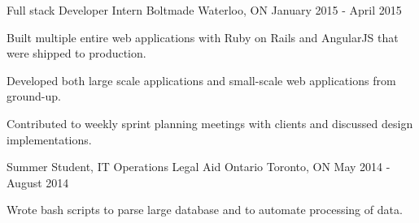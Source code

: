 \begin{cventries}
  \cventry
    {Full stack Developer Intern} %
    {Boltmade} %
    {Waterloo, ON} %
    {January 2015 - April 2015} %
    {
      \begin{cvitems} %
      \item {Built multiple entire web applications with Ruby on Rails and AngularJS that were shipped to production.}
      \item {Developed both large scale applications and small-scale web applications from ground-up.}
      \item {Contributed to weekly sprint planning meetings with clients and discussed design implementations.}
  \end{cvitems} 
    }
  \cventry
    {Summer Student, IT Operations} %
    {Legal Aid Ontario} %
    {Toronto, ON} %
    {May 2014 - August 2014} %
    {
      \begin{cvitems} %
      \item {Wrote bash scripts to parse large database and to automate processing of data.}
  \end{cvitems} 
    }

\end{cventries}
